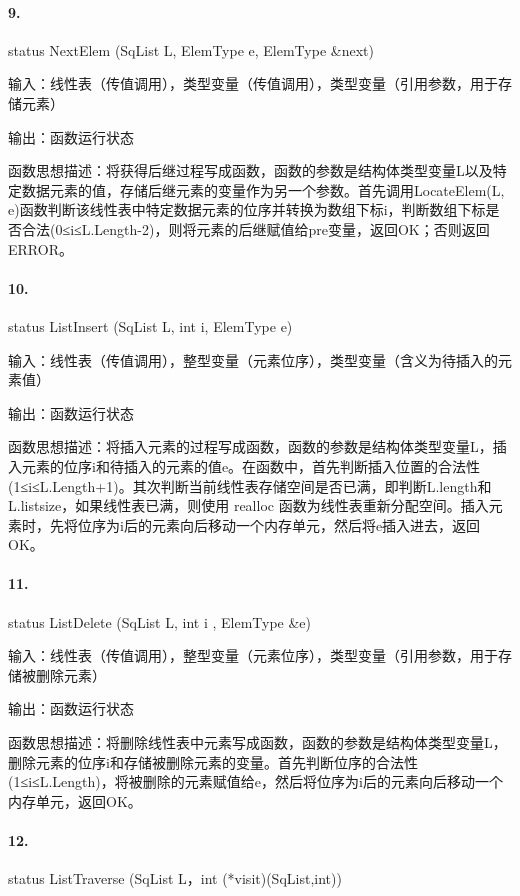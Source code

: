 \documentclass[supercite]{Experimental_Report}
\theoremstyle{definition}
\begin{document}
\paragraph{ 9.}status NextElem (SqList L, ElemType e, ElemType \&next)

输入：线性表（传值调用），类型变量（传值调用），类型变量（引用参数，用于存储元素）

输出：函数运行状态

函数思想描述：将获得后继过程写成函数，函数的参数是结构体类型变量L以及特定数据元素的值，存储后继元素的变量作为另一个参数。首先调用LocateElem(L, e)函数判断该线性表中特定数据元素的位序并转换为数组下标i，判断数组下标是否合法(0≤i≤L.Length-2)，则将元素的后继赋值给pre变量，返回OK；否则返回ERROR。

\paragraph{10.}status ListInsert (SqList L, int i, ElemType e)

输入：线性表（传值调用），整型变量（元素位序），类型变量（含义为待插入的元素值）

输出：函数运行状态

函数思想描述：将插入元素的过程写成函数，函数的参数是结构体类型变量L，插入元素的位序i和待插入的元素的值e。在函数中，首先判断插入位置的合法性(1≤i≤L.Length+1)。其次判断当前线性表存储空间是否已满，即判断L.length和L.listsize，如果线性表已满，则使用 realloc 函数为线性表重新分配空间。插入元素时，先将位序为i后的元素向后移动一个内存单元，然后将e插入进去，返回OK。

\paragraph{11.}status ListDelete (SqList L, int i , ElemType \&e)

输入：线性表（传值调用），整型变量（元素位序），类型变量（引用参数，用于存储被删除元素）

输出：函数运行状态

函数思想描述：将删除线性表中元素写成函数，函数的参数是结构体类型变量L，删除元素的位序i和存储被删除元素的变量。首先判断位序的合法性(1≤i≤L.Length)，将被删除的元素赋值给e，然后将位序为i后的元素向后移动一个内存单元，返回OK。

\paragraph{12.}status ListTraverse (SqList L，int (*visit)(SqList,int))
\end{document}
